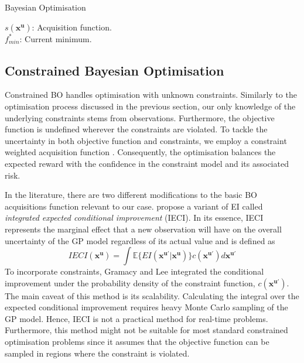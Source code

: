 \documentclass[shortAfour,sageh,times]{sagej_no_sage}
\newlength\mylen
\newcommand\myinput[1]{%
  \settowidth\mylen{\KwIn{}}%
  \setlength\hangindent{\mylen}%
  \hspace*{\mylen}#1\\}
\begin{document}
\begin{algorithm}[bt]
	\caption{Bayesian Optimisation}
	\label{basic_BO_algo}
	\DontPrintSemicolon
	\myinput{${s(\boldsymbol{x}^{\boldsymbol{u}})}$: Acquisition function.}
	\myinput{$f^*_{min}$: Current minimum.}
\end{algorithm}


\subsection{Constrained Bayesian Optimisation}\label{subsec:CBO_Const_BO}
Constrained BO handles optimisation with unknown constraints. Similarly to the optimisation process discussed in the previous section, our only knowledge of the underlying constraints stems from observations. Furthermore, the objective function is undefined wherever the constraints are violated. To tackle the uncertainty in both objective function and constraints, we employ a constraint weighted acquisition function \citep{Gelbart2014}. Consequently, the optimisation balances the expected reward with the confidence in the constraint model and its associated risk.

In the literature, there are two different modifications to the basic BO acquisitions function relevant to our case. \citet{Gramacy2011} propose a variant of EI called \textit{integrated expected conditional improvement} (IECI). In its essence, IECI represents the marginal effect that a new observation will have on the overall uncertainty of the GP model regardless of its actual value and is defined as
\begin{equation}\label{IECI}
		IECI(\boldsymbol{x}^{\boldsymbol{u}})= \int \mathbb{E}\{EI(\boldsymbol{x}^{\boldsymbol{u'}}|\boldsymbol{x}^{\boldsymbol{u}})\}c(\boldsymbol{x}^{\boldsymbol{u'}})d\boldsymbol{x}^{\boldsymbol{u'}} 
\end{equation}
To incorporate constraints, Gramacy and Lee integrated the conditional improvement under the probability density of the constraint function, $c(\boldsymbol{x}^{\boldsymbol{u'}})$. The main caveat of this method is its scalability. Calculating the integral over the expected conditional improvement requires heavy Monte Carlo sampling of the GP model. Hence, IECI is not a practical method for real-time problems. Furthermore, this method might not be suitable for most standard constrained optimisation problems since it assumes that the objective function can be sampled in regions where the constraint is violated. 
\end{document}
